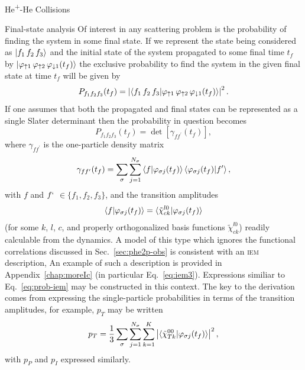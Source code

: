 \documentclass[letterpaper, 11 pt]{report}
\begin{document}
\begin{chapter}{\texorpdfstring{He\textsuperscript{+}}{He+}-He Collisions \label{chap:hephe}}
\begin{section}{Final-state analysis \label{sec:hephe-det}}
      Of interest in any scattering problem is the probability of finding the system in some final state.
      If we represent the state being considered as $\ket{f_1 \, f_2 \, f_3}$ and the initial state of
      the system propagated to some final time $t_f$ by $\ket{\varphi_{ \uparrow 1} \,
      \varphi_{\uparrow 2} \, \varphi_{\downarrow 1} (t_f)}$ the exclusive probability to find the
      system in the given final state at time $t_f$ will be given by
      \begin{equation} \label{eq:finalProb}
         P_{f_1 f_2 f_3}(t_f) = \left| \braket{ f_1 \, f_2 \, f_3 | \varphi_{ \uparrow 1} \,
                                       \varphi_{\uparrow 2} \, \varphi_{\downarrow 1} (t_f) } \right|^2.
      \end{equation}
      If one assumes that both the propagated and final states can be represented as a single Slater
      determinant then the probability in question becomes
      \begin{equation} \label{eq:detProb}
         P_{f_1 f_2 f_3}(t_f) = \det \left[ \gamma_{f f^\prime}(t_f) \right],
      \end{equation}
      where $\gamma_{f f^\prime}$ is the one-particle density matrix
      \begin{equation} \label{eq:denmat}
         \gamma_{f f^\prime}(t_f) = \sum\limits_{\sigma} \sum\limits_{j = 1}^{N_\sigma}
                               \braket{f | \varphi_{\sigma j}(t_f)}
                               \braket{\varphi_{\sigma j}(t_f) | f^\prime},
      \end{equation}
      with $f$ and $f`$ $\in \{f_1, f_2, f_3\}$, and the transition amplitudes
      \begin{equation}
         \braket{f | \varphi_{\sigma j}(t_f)}
         = \braket{\tilde{\chi}^{l0}_{c k} | \varphi_{\sigma j}(t_f)}
      \end{equation}
      (for some $k$, $l$, $c$, and properly orthogonalized basis functions $\tilde{\chi}^{l0}_{c k}$)
      readily calculable from the dynamics. A model of this type which ignores the functional
      correlations discussed in Sec.~\ref{sec:phe2p-obs} is consistent with an \textsc{iem} description,
      An example of such a description is provided in Appendix~\ref{chap:moreIc} (in particular
      Eq.~\eqref{eq:iem3}). Expressions similiar to Eq.~\eqref{eq:prob-iem} may be constructed in this
      context. The key to the derivation comes from expressing the single-particle probabilities in
      terms of the transition amplitudes, for example, $p_T$ may be written
      \begin{equation} \label{eq:ptTrans}
         p_T = \frac{1}{3} \sum\limits_{\sigma} \sum\limits_{j = 1}^{N_\sigma} \sum\limits_{k = 1}^{K}
               \left| \braket{ \tilde{\chi}^{00}_{T k} | \varphi_{\sigma j}(t_f)}\right|^2,
      \end{equation}
      with $p_P$ and $p_I$ expressed similarly.


\end{section}
\end{chapter}
\end{document}
